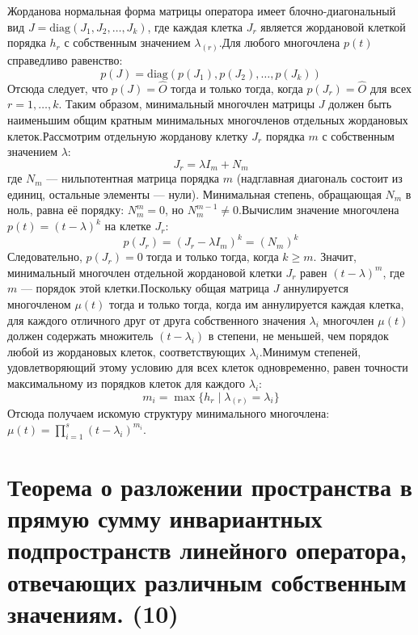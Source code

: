 \documentclass[14pt]{extreport}
\begin{document}
    \begin{prbox}
        Жорданова нормальная форма матрицы оператора имеет блочно-диагональный вид $J = \text{diag}(J_1, J_2, \dots, J_k)$, где каждая клетка $J_r$ является жордановой клеткой порядка $h_r$ с собственным значением $\lambda_{(r)}$.Для любого многочлена $p(t)$ справедливо равенство:$$p(J) = \text{diag}(p(J_1), p(J_2), \dots, p(J_k))$$Отсюда следует, что $p(J) = \hat{O}$ тогда и только тогда, когда $p(J_r) = \hat{O}$ для всех $r = 1, \dots, k$. Таким образом, минимальный многочлен матрицы $J$ должен быть наименьшим общим кратным минимальных многочленов отдельных жордановых клеток.Рассмотрим отдельную жорданову клетку $J_r$ порядка $m$ с собственным значением $\lambda$:$$J_r = \lambda I_m + N_m$$где $N_m$ — нильпотентная матрица порядка $m$ (надглавная диагональ состоит из единиц, остальные элементы — нули). Минимальная степень, обращающая $N_m$ в ноль, равна её порядку: $N_m^m = 0$, но $N_m^{m-1} \neq 0$.Вычислим значение многочлена $p(t) = (t - \lambda)^k$ на клетке $J_r$:$$p(J_r) = (J_r - \lambda I_m)^k = (N_m)^k$$Следовательно, $p(J_r) = 0$ тогда и только тогда, когда $k \ge m$. Значит, минимальный многочлен отдельной жордановой клетки $J_r$ равен $(t - \lambda)^m$, где $m$ — порядок этой клетки.Поскольку общая матрица $J$ аннулируется многочленом $\mu(t)$ тогда и только тогда, когда им аннулируется каждая клетка, для каждого отличного друг от друга собственного значения $\lambda_i$ многочлен $\mu(t)$ должен содержать множитель $(t - \lambda_i)$ в степени, не меньшей, чем порядок любой из жордановых клеток, соответствующих $\lambda_i$.Минимум степеней, удовлетворяющий этому условию для всех клеток одновременно, равен точности максимальному из порядков клеток для каждого $\lambda_i$:$$m_i = \max \{ h_r \mid \lambda_{(r)} = \lambda_i \}$$Отсюда получаем искомую структуру минимального многочлена: $\mu(t) = \prod_{i=1}^s (t - \lambda_i)^{m_i}$.
    \end{prbox}


    \chapter{Теорема о разложении пространства в прямую сумму инвариантных подпространств
линейного оператора, отвечающих различным собственным значениям. (10)}
\end{document}
